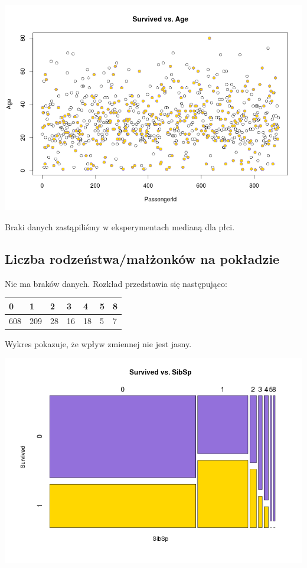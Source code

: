 \documentclass{article}
\begin{document}
\includegraphics[scale=0.40]{images/survived-vs-age.png}

Braki danych zastąpiliśmy w eksperymentach medianą dla płci.

\subsection{Liczba rodzeństwa/małżonków na pokładzie}

Nie ma braków danych. Rozkład przedstawia się następująco:
\begin{center}
    \begin{tabular}{| l | l | l | l | l | l | l |}
    \hline
0 &  1  & 2  & 3  & 4 &  5 &  8  \\ \hline
608 & 209 & 28 & 16 & 18 &  5 &  7 \\
    \hline
    \end{tabular}
\end{center}

Wykres pokazuje, że wpływ zmiennej nie jest jasny.

\includegraphics[scale=0.40]{images/survived-vs-sibsp.png}
\end{document}
